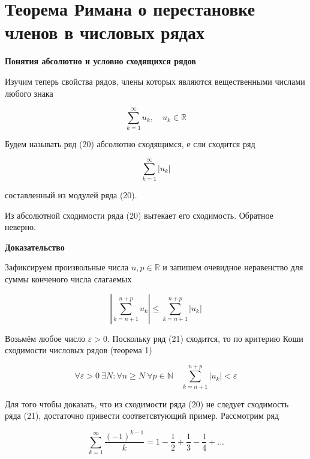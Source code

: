 \section{Теорема Римана о перестановке членов в числовых рядах}

\textbf{Понятия абсолютно и условно сходящихся рядов}

Изучим теперь свойства рядов, члены которых являются вещественными числами любого знака

\begin{equation}
	\displaystyle\sum_{k = 1}^\infty u_k,\quad u_k \in \mathbb{R}
\end{equation}

\begin{definition}
	Будем называть ряд (20) абсолютно сходящимся, е  сли сходится ряд
	
	\begin{equation}
		\displaystyle\sum_{k = 1}^\infty |u_k|
	\end{equation}
	
	составленный из модулей ряда (20).
\end{definition}

\begin{statm}
	Из абсолютной сходимости ряда (20) вытекает его сходимость. Обратное неверно.
\end{statm}

\textbf{Доказательство}

Зафиксируем произвольные числа $n, p\in \mathbb{R}$ и запишем очевидное  неравенство для суммы конченого числа  слагаемых

\begin{equation}
	\left| \displaystyle\sum_{k = n + 1}^{n + p} u_k \right| \leqslant \displaystyle\sum_{k = n + 1}^{n + p} |u_k|
\end{equation}

Возьмём  любое число $\varepsilon > 0$. Поскольку ряд (21) сходится, то по критерию Коши сходимости числовых рядов (теорема 1)

\begin{equation*}
	\forall\varepsilon > 0\ \exists N: \forall n \geqslant N\ \forall p \in \mathbb{N} \quad \displaystyle\sum_{k = n + 1}^{n + p} |u_k| < \varepsilon
\end{equation*}

Для того чтобы доказать, что из сходимости ряда (20) не следует сходимость ряда (21), достаточно привести соответсвтующий пример. Рассмотрим ряд

\begin{equation}
	\displaystyle\sum_{k =1}^\infty \frac{(-1)^{k - 1}}{k} = 1 - \frac{1}{2} + \frac{1}{3} - \frac{1}{4} + ...
\end{equation}

